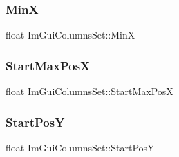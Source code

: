 \hypertarget{struct_im_gui_columns_set_a953e9dc01eab7503a48644e051b61476}{}\label{struct_im_gui_columns_set_a953e9dc01eab7503a48644e051b61476} 
\subsubsection{\texorpdfstring{MinX}{MinX}}
{\footnotesize\ttfamily float Im\+Gui\+Columns\+Set\+::\+MinX}

\hypertarget{struct_im_gui_columns_set_a61470bb069a752930fc8a838e9f552d3}{}\label{struct_im_gui_columns_set_a61470bb069a752930fc8a838e9f552d3} 
\subsubsection{\texorpdfstring{Start\+Max\+PosX}{StartMaxPosX}}
{\footnotesize\ttfamily float Im\+Gui\+Columns\+Set\+::\+Start\+Max\+PosX}

\hypertarget{struct_im_gui_columns_set_a32611b7e09fb2dbdcc5342fecc3a0f6c}{}\label{struct_im_gui_columns_set_a32611b7e09fb2dbdcc5342fecc3a0f6c} 
\subsubsection{\texorpdfstring{Start\+PosY}{StartPosY}}
{\footnotesize\ttfamily float Im\+Gui\+Columns\+Set\+::\+Start\+PosY}

